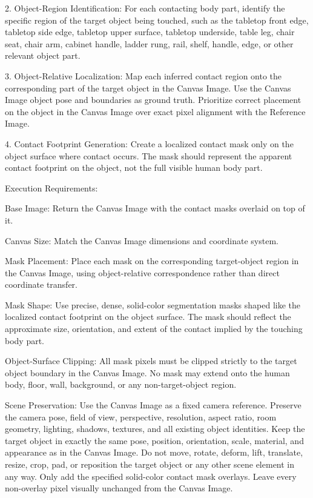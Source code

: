 \begin{promptblock}
2. Object-Region Identification:
   For each contacting body part, identify the specific region of the target object being touched, such as the tabletop front edge, tabletop side edge, tabletop upper surface, tabletop underside, table leg, chair seat, chair arm, cabinet handle, ladder rung, rail, shelf, handle, edge, or other relevant object part.

3. Object-Relative Localization:
   Map each inferred contact region onto the corresponding part of the target object in the Canvas Image. Use the Canvas Image object pose and boundaries as ground truth. Prioritize correct placement on the object in the Canvas Image over exact pixel alignment with the Reference Image.

4. Contact Footprint Generation:
   Create a localized contact mask only on the object surface where contact occurs. The mask should represent the apparent contact footprint on the object, not the full visible human body part.

Execution Requirements:

Base Image:
Return the Canvas Image with the contact masks overlaid on top of it.

Canvas Size:
Match the Canvas Image dimensions and coordinate system.

Mask Placement:
Place each mask on the corresponding target-object region in the Canvas Image, using object-relative correspondence rather than direct coordinate transfer.

Mask Shape:
Use precise, dense, solid-color segmentation masks shaped like the localized contact footprint on the object surface. The mask should reflect the approximate size, orientation, and extent of the contact implied by the touching body part.

Object-Surface Clipping:
All mask pixels must be clipped strictly to the target object boundary in the Canvas Image. No mask may extend onto the human body, floor, wall, background, or any non-target-object region.

Scene Preservation:
Use the Canvas Image as a fixed camera reference. Preserve the camera pose, field of view, perspective, resolution, aspect ratio, room geometry, lighting, shadows, textures, and all existing object identities.
Keep the target object in exactly the same pose, position, orientation, scale, material, and appearance as in the Canvas Image. Do not move, rotate, deform, lift, translate, resize, crop, pad, or reposition the target object or any other scene element in any way.
Only add the specified solid-color contact mask overlays. Leave every non-overlay pixel visually unchanged from the Canvas Image.


\end{promptblock}

